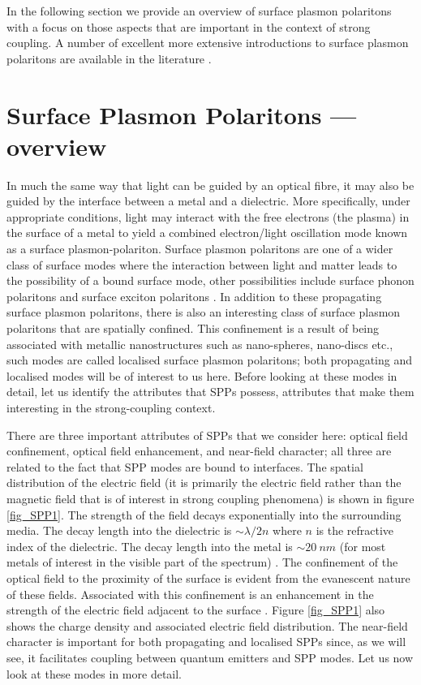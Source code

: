 \documentclass[12pt]{iopart}
\begin{document}
In the following section we provide an overview of surface plasmon polaritons with a focus on those aspects that are important in the context of strong coupling. A number of excellent more extensive introductions to surface plasmon polaritons are available in the literature 
\cite{Zayats_PhysRep_2005_408_131,LRandE,Pitarke_RepProgPhys_2007_70_1,Maier}.

\section{Surface Plasmon Polaritons --- overview} \label{basics}

In much the same way that light can be guided by an optical fibre, it may also be guided by the interface between a metal and a dielectric. More specifically, under appropriate conditions, light may interact with the free electrons (the plasma) in the surface of a metal to yield a combined electron/light oscillation mode known as a surface plasmon-polariton. Surface plasmon polaritons are one of a wider class of surface modes where the interaction between light and matter leads to the possibility of a bound surface mode, other possibilities include surface phonon polaritons 
\cite{Huber_APL_2005_87_081103} and surface exciton polaritons \cite{Gentile_NL_2014_14_2339}. In addition to these propagating surface plasmon polaritons, there is also an interesting class of surface plasmon polaritons that are spatially confined. This confinement is a result of being associated with metallic nanostructures such as nano-spheres, nano-discs etc., such modes are called localised surface plasmon polaritons; both propagating and localised modes will be of interest to us here. Before looking at these modes in detail, let us identify the attributes that SPPs possess, attributes that make them interesting in the strong-coupling context.

There are three important attributes of SPPs that we consider here: optical field confinement, optical field enhancement, and near-field character; all three are related to the fact that SPP modes are bound to interfaces. The spatial distribution of the electric field (it is primarily the electric field rather than the magnetic field that is of interest in strong coupling phenomena) is shown in figure \ref{fig_SPP1}. The strength of the field decays exponentially into the surrounding media. The decay length into the dielectric is $\sim\lambda/2n$ where $n$ is the refractive index of the dielectric. The decay length into the metal is $\sim 20\ nm$ (for most metals of interest in the visible part of the spectrum) \cite{Barnes_JOptA_2006_8_S87}. The confinement of the optical field to the proximity of the surface is evident from the evanescent nature of these fields. Associated with this confinement is an enhancement in the strength of the electric field adjacent to the surface \cite{LRandE}. Figure \ref{fig_SPP1} also shows the charge density and associated electric field distribution. The near-field character is important for both propagating and localised SPPs since, as we will see, it facilitates coupling between quantum emitters and SPP modes. Let us now look at these modes in more detail.
\end{document}
